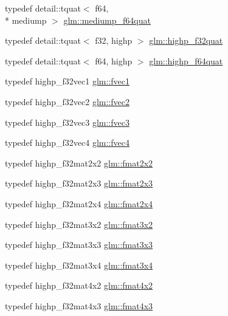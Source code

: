 \begin{DoxyCompactItemize}
\item 
typedef detail\-::tquat$<$ f64, \\*
mediump $>$ \hyperlink{group__gtc__type__precision_ga7cf626acf7f4fc29355c147bfe05163d}{glm\-::mediump\-\_\-f64quat}
\item 
typedef detail\-::tquat$<$ f32, highp $>$ \hyperlink{group__gtc__type__precision_ga26eef27d2efbd759e7e93c40672402e9}{glm\-::highp\-\_\-f32quat}
\item 
typedef detail\-::tquat$<$ f64, highp $>$ \hyperlink{group__gtc__type__precision_ga9372e8b60f401fd94aba637b3ed17cfc}{glm\-::highp\-\_\-f64quat}
\item 
typedef highp\-\_\-f32vec1 \hyperlink{group__gtc__type__precision_gab927d62f22fa57461367011950cec650}{glm\-::fvec1}
\item 
typedef highp\-\_\-f32vec2 \hyperlink{group__gtc__type__precision_gaafd518792a4646c7bb60aabc62a4684c}{glm\-::fvec2}
\item 
typedef highp\-\_\-f32vec3 \hyperlink{group__gtc__type__precision_ga33b85a14a8f68ec99029ff13db6af369}{glm\-::fvec3}
\item 
typedef highp\-\_\-f32vec4 \hyperlink{group__gtc__type__precision_ga55d1365630d3b3ecf7c7f4e7c29a9cb1}{glm\-::fvec4}
\item 
typedef highp\-\_\-f32mat2x2 \hyperlink{group__gtc__type__precision_gada7823c23ae249dccaecb5a016c667f4}{glm\-::fmat2x2}
\item 
typedef highp\-\_\-f32mat2x3 \hyperlink{group__gtc__type__precision_ga087d875cd4e384f101a28a4caf8ccd94}{glm\-::fmat2x3}
\item 
typedef highp\-\_\-f32mat2x4 \hyperlink{group__gtc__type__precision_gaf3af7a2f10aaf8028a95b7232b24d84e}{glm\-::fmat2x4}
\item 
typedef highp\-\_\-f32mat3x2 \hyperlink{group__gtc__type__precision_ga723b6e3dd4ff1c0d76d3c9f72ea0d9a7}{glm\-::fmat3x2}
\item 
typedef highp\-\_\-f32mat3x3 \hyperlink{group__gtc__type__precision_gafa6841eaaa5ee45de1d892c26b349571}{glm\-::fmat3x3}
\item 
typedef highp\-\_\-f32mat3x4 \hyperlink{group__gtc__type__precision_ga87084a1f4d6e8dd94f719029840dbafc}{glm\-::fmat3x4}
\item 
typedef highp\-\_\-f32mat4x2 \hyperlink{group__gtc__type__precision_ga0cf4b66f4929b3c21ab7b967386fc7dd}{glm\-::fmat4x2}
\item 
typedef highp\-\_\-f32mat4x3 \hyperlink{group__gtc__type__precision_ga5af77d2574bca528d321fbf261c90107}{glm\-::fmat4x3}

\end{DoxyCompactItemize}
